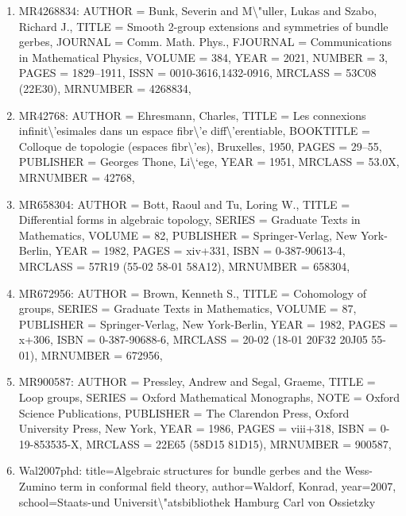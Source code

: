 \documentclass[11pt]{article}
\begin{document}
\begin{enumerate}[leftmargin=*]
  \item MR4268834: AUTHOR = Bunk, Severin and M\textbackslash{}"uller, Lukas and Szabo, Richard J., TITLE = Smooth 2-group extensions and symmetries of bundle gerbes, JOURNAL = Comm. Math. Phys., FJOURNAL = Communications in Mathematical Physics, VOLUME = 384, YEAR = 2021, NUMBER = 3, PAGES = 1829--1911, ISSN = 0010-3616,1432-0916, MRCLASS = 53C08 (22E30), MRNUMBER = 4268834,
  \item MR42768: AUTHOR = Ehresmann, Charles, TITLE = Les connexions infinit\textbackslash{}'esimales dans un espace fibr\textbackslash{}'e diff\textbackslash{}'erentiable, BOOKTITLE = Colloque de topologie (espaces fibr\textbackslash{}'es), Bruxelles, 1950, PAGES = 29--55, PUBLISHER = Georges Thone, Li\textbackslash{}`ege, YEAR = 1951, MRCLASS = 53.0X, MRNUMBER = 42768,
  \item MR658304: AUTHOR = Bott, Raoul and Tu, Loring W., TITLE = Differential forms in algebraic topology, SERIES = Graduate Texts in Mathematics, VOLUME = 82, PUBLISHER = Springer-Verlag, New York-Berlin, YEAR = 1982, PAGES = xiv+331, ISBN = 0-387-90613-4, MRCLASS = 57R19 (55-02 58-01 58A12), MRNUMBER = 658304,
  \item MR672956: AUTHOR = Brown, Kenneth S., TITLE = Cohomology of groups, SERIES = Graduate Texts in Mathematics, VOLUME = 87, PUBLISHER = Springer-Verlag, New York-Berlin, YEAR = 1982, PAGES = x+306, ISBN = 0-387-90688-6, MRCLASS = 20-02 (18-01 20F32 20J05 55-01), MRNUMBER = 672956,
  \item MR900587: AUTHOR = Pressley, Andrew and Segal, Graeme, TITLE = Loop groups, SERIES = Oxford Mathematical Monographs, NOTE = Oxford Science Publications, PUBLISHER = The Clarendon Press, Oxford University Press, New York, YEAR = 1986, PAGES = viii+318, ISBN = 0-19-853535-X, MRCLASS = 22E65 (58D15 81D15), MRNUMBER = 900587,
  \item Wal2007phd: title=Algebraic structures for bundle gerbes and the Wess-Zumino term in conformal field theory, author=Waldorf, Konrad, year=2007, school=Staats-und Universit\textbackslash{}"atsbibliothek Hamburg Carl von Ossietzky
\end{enumerate}

% 
% 
\end{document}
